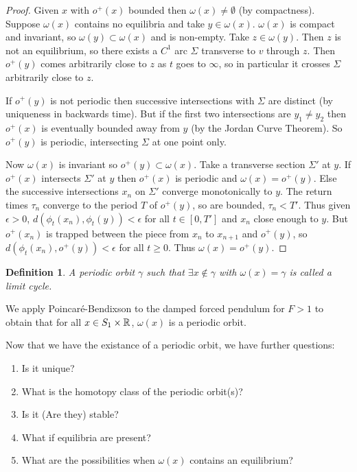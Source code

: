 \documentclass{notes}
\theoremstyle{plain}
\newtheorem*{definition}{Definition}
\begin{document}
\begin{proof}
Given $x$ with $o^+(x)$ bounded then $\omega(x) \ne \emptyset$ (by
compactness).  Suppose $\omega(x)$ contains no equilibria and take $y
\in \omega(x)$.  $\omega(x)$ is compact and invariant, so
$\omega(y) \subset \omega(x)$ and is non-empty.  Take $z \in \omega(y)$.
Then $z$ is not an equilibrium, so there exists a $C^1$ arc $\Sigma$
transverse to $v$ through $z$.  Then $o^+(y)$ comes arbitrarily
close to $z$ as $t$ goes to $\infty$, so in particular it crosses $\Sigma$
arbitrarily close to $z$.

If $o^+(y)$ is not periodic then successive intersections with $\Sigma$
are distinct (by uniqueness in backwards time).  But if the first
two intersections are $y_1 \neq y_2$ then $o^+(x)$ is eventually bounded 
away from $y$ (by the Jordan Curve Theorem).  So $o^+(y)$ is periodic,
intersecting $\Sigma$ at one point only.

Now $\omega(x)$ is invariant so $o^+(y) \subset \omega(x)$.  Take a
transverse section $\Sigma'$ at $y$.  If $o^+(x)$ intersects $\Sigma'$
at $y$ then $o^+(x)$ is periodic and $\omega(x) = o^+(y)$.  Else the
successive intersections $x_n$ on $\Sigma'$ converge monotonically to
$y$.  The return times $\tau_n$ converge to the period $T$ of
$o^+(y)$, so are bounded, $\tau_n < T'$.  Thus given $\epsilon > 0$,
$d(\phi_t(x_n), \phi_t(y)) < \epsilon$ for all $t \in [0,T']$ and
$x_n$ close enough to $y$.  But $o^+(x_n)$ is trapped between the
piece from $x_n$ to $x_{n+1}$ and $o^+(y)$, so $d(\phi_t(x_n), o^+(y))
< \epsilon$ for all $t \ge 0$.  Thus $\omega(x) = o^+(y)$.
\end{proof}

\begin{definition}
A periodic orbit $\gamma$ such that $\exists x \notin \gamma$ with
$\omega(x) = \gamma$ is called a limit cycle.
\end{definition}

We apply Poincar\'e-Bendixson to the damped forced pendulum for $F>1$ to
obtain that for all $x\in S_1 \times \mathbb{R}$, $\omega(x)$ is a periodic orbit.

Now that we have the existance of a periodic orbit, we have further questions:

\begin{enumerate}
\item Is it unique?
\item What is the homotopy class of the periodic orbit(s)?
\item Is it (Are they) stable?
\item What if equilibria are present?
\item What are the possibilities when $\omega(x)$ contains an equilibrium?
\end{enumerate}
\end{document}
